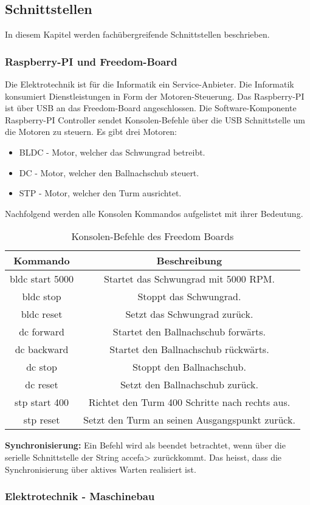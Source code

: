 \subsection{Schnittstellen}
In diesem Kapitel werden fachübergreifende Schnittstellen beschrieben.

\subsubsection{Raspberry-PI und Freedom-Board}
Die Elektrotechnik ist für die Informatik ein Service-Anbieter. Die Informatik konsumiert Dienstleistungen in Form der Motoren-Steuerung. Das Raspberry-PI ist über USB an das Freedom-Board angeschlossen. Die Software-Komponente Raspberry-PI Controller sendet Konsolen-Befehle über die USB Schnittstelle um die Motoren zu steuern. Es gibt drei Motoren:

\begin{itemize}
	\item BLDC - Motor, welcher das Schwungrad betreibt.
	\item DC - Motor, welcher den Ballnachschub steuert.
	\item STP - Motor, welcher den Turm ausrichtet.
\end{itemize}

\noindent
Nachfolgend werden alle Konsolen Kommandos aufgelistet mit ihrer Bedeutung. \\

\begin{table}[h!]
	\centering
	\begin{tabular}{|c|c|}
		\hline \textbf{Kommando}  & \textbf{Beschreibung} \\ 
		\hline bldc start 5000  & Startet das Schwungrad mit 5000 RPM. \\ 
		\hline bldc stop & Stoppt das Schwungrad.  \\ 
		\hline bldc reset & Setzt das Schwungrad zurück. \\ 
		\hline dc forward & Startet den Ballnachschub forwärts. \\ 
		\hline dc backward & Startet den Ballnachschub rückwärts. \\ 
		\hline dc stop & Stoppt den Ballnachschub. \\ 
	    \hline dc reset & Setzt den Ballnachschub zurück. \\ 
	    \hline stp start 400 & Richtet den Turm 400 Schritte nach rechts aus. \\ 
	    \hline stp reset & Setzt den Turm an seinen Ausgangspunkt zurück. \\ 
		\hline 
	\end{tabular} 
	\caption{Konsolen-Befehle des Freedom Boards}
	\label{tab:freedom-board-konsolen-befehle}
\end{table}

\noindent
\textbf{Synchronisierung:} Ein Befehl wird als beendet betrachtet, wenn über die serielle Schnittstelle der String accefa> zurückkommt. Das heisst, dass die Synchronisierung über aktives Warten realisiert ist.

\subsubsection{Elektrotechnik - Maschinebau}